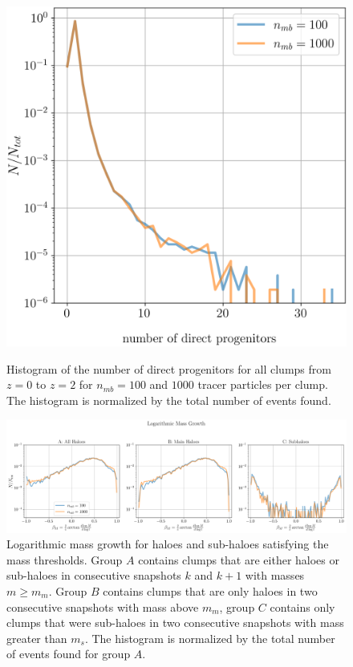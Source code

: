 \begin{figure}
	\centering
	\includegraphics[width=.7\linewidth, keepaspectratio]
	{figures/ACACIA/tree-statistics-sussing-threshold/branching-ratio-ntrace.png}\\%
	\caption{
		Histogram of the number of direct progenitors for all clumps from $z = 0$ to $z = 2$ for $n_{mb} = 100$ and $1000$ tracer particles per clump.
		The histogram is normalized by the total number of events found.
	}%
	\label{fig:sussing-branching-ratio}
\end{figure}


\begin{figure}
	\centering
	\includegraphics[width=\textwidth, keepaspectratio]
	{figures/ACACIA/tree-statistics-sussing-threshold/mass_growth-ntrace.png}%
	\caption{
		Logarithmic mass growth for haloes and sub-haloes satisfying the mass thresholds.
		Group $A$ contains clumps that are either haloes or sub-haloes in consecutive snapshots $k$ and $k+1$ with masses $m \geq m_{m}$.
		Group $B$ contains clumps that are only haloes in two consecutive snapshots with mass above $m_{m}$, group $C$ contains only clumps that were sub-haloes in two consecutive snapshots with mass greater than $m_{s}$.
		The histogram is normalized by the total number of events found for group $A$.
	}%
	\label{fig:sussing-mass-growth}
\end{figure}

